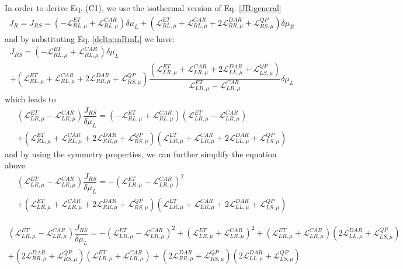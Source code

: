 In order to derive Eq. (C1), we use the isothermal version of Eq. \eqref{JR:general}
\begin{align*}
J_{R}=J_{RS}=
(-\mathcal{L}_{RL,\mu}^{ET}+
\mathcal{L}_{RL,\mu}^{CAR})\delta\mu_{L}
+
(\mathcal{L}_{RL,\mu}^{ET}+\mathcal{L}_{RL,\mu}^{CAR}+2\mathcal{L}_{RR,\mu}^{DAR}
+
\mathcal{L}^{QP}_{RS,\mu})\delta\mu_{R}
\end{align*}
and by substituting Eq. \eqref{delta:mRmL} we have:
\begin{multline*}
J_{RS}=
(-\mathcal{L}_{RL,\mu}^{ET}+
\mathcal{L}_{RL,\mu}^{CAR})\delta\mu_{L}
\\+
(\mathcal{L}_{RL,\mu}^{ET}+\mathcal{L}_{RL,\mu}^{CAR}+2\mathcal{L}_{RR,\mu}^{DAR}
+
\mathcal{L}^{QP}_{RS,\mu})\dfrac{(\mathcal{L}_{LR,\mu}^{ET}+\mathcal{L}_{LR,\mu}^{CAR}+2\mathcal{L}_{LL,\mu}^{DAR}
+
\mathcal{L}^{QP}_{LS,\mu})}{\mathcal{L}_{LR,\mu}^{ET}-\mathcal{L}_{LR,\mu}^{CAR}}\delta\mu_{L}
\end{multline*}
which leads to 
\begin{multline*}
(\mathcal{L}_{LR,\mu}^{ET}-\mathcal{L}_{LR,\mu}^{CAR})\dfrac{J_{RS}}{\delta\mu_{L}}=
(-\mathcal{L}_{RL,\mu}^{ET}+
\mathcal{L}_{RL,\mu}^{CAR})(\mathcal{L}_{LR,\mu}^{ET}-\mathcal{L}_{LR,\mu}^{CAR})
\\+
(\mathcal{L}_{RL,\mu}^{ET}+\mathcal{L}_{RL,\mu}^{CAR}+2\mathcal{L}_{RR,\mu}^{DAR}
+
\mathcal{L}^{QP}_{RS,\mu})(\mathcal{L}_{LR,\mu}^{ET}+\mathcal{L}_{LR,\mu}^{CAR}+2\mathcal{L}_{LL,\mu}^{DAR}
+
\mathcal{L}^{QP}_{LS,\mu})
\end{multline*}
and by using the symmetry properties, we can further simplify the equation above
\begin{multline*}
(\mathcal{L}_{LR,\mu}^{ET}-\mathcal{L}_{LR,\mu}^{CAR})\dfrac{J_{RS}}{\delta\mu_{L}}=
-(\mathcal{L}_{LR,\mu}^{ET}-
\mathcal{L}_{LR,\mu}^{CAR})^{2}
\\+
(\mathcal{L}_{LR,\mu}^{ET}+\mathcal{L}_{LR,\mu}^{CAR}+2\mathcal{L}_{RR,\mu}^{DAR}
+
\mathcal{L}^{QP}_{RS,\mu})(\mathcal{L}_{LR,\mu}^{ET}+\mathcal{L}_{LR,\mu}^{CAR}+2\mathcal{L}_{LL,\mu}^{DAR}
+
\mathcal{L}^{QP}_{LS,\mu})
\end{multline*}



\begin{multline*}
(\mathcal{L}_{LR,\mu}^{ET}-\mathcal{L}_{LR,\mu}^{CAR})\dfrac{J_{RS}}{\delta\mu_{L}}=
-(\mathcal{L}_{LR,\mu}^{ET}-
\mathcal{L}_{LR,\mu}^{CAR})^{2}
+
(\mathcal{L}_{LR,\mu}^{ET}+\mathcal{L}_{LR,\mu}^{CAR})^{2}
+
(\mathcal{L}_{LR,\mu}^{ET}+\mathcal{L}_{LR,\mu}^{CAR})
(2\mathcal{L}_{LL,\mu}^{DAR}+\mathcal{L}^{QP}_{LS,\mu})
\\+
(2\mathcal{L}_{RR,\mu}^{DAR}+\mathcal{L}^{QP}_{RS,\mu})
(\mathcal{L}_{LR,\mu}^{ET}+\mathcal{L}_{LR,\mu}^{CAR})
+
(2\mathcal{L}_{RR,\mu}^{DAR}+\mathcal{L}^{QP}_{RS,\mu})
(2\mathcal{L}_{LL,\mu}^{DAR}+\mathcal{L}^{QP}_{LS,\mu})
\end{multline*}



